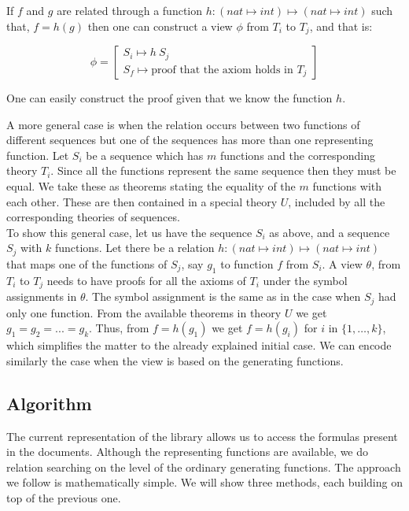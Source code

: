 If $f$ and $g$ are related through a function $h : (nat \mapsto int) \mapsto (nat \mapsto int)$ such that, $f = h(g)$
 then one can construct a view $\phi$ from $T_i$ to $T_j$, and that is:

\begin{equation}
\phi = \begin{bmatrix} S_i \mapsto h\ S_j  \\ S_{f} \mapsto  \text{proof that the axiom holds in } T_j \end{bmatrix}
\end{equation}

One can easily construct the proof given that we know the function $h$.

A more general case is when the relation occurs between two functions of different sequences but one of the sequences
 has more than one representing function.
Let $S_i$ be a sequence which has $m$ functions and the corresponding theory $T_i$. Since all the functions represent
 the same sequence then they must be equal. We take these as theorems stating the equality of the $m$ functions with
 each other. These are then contained in a special theory $U$, included by all the corresponding theories of sequences. \\
To show this general case, let us have the sequence $S_i$ as above, and a sequence $S_j$ with $k$ functions. Let
there be a relation $h: (nat \mapsto int) \mapsto (nat \mapsto int)$ that maps one of the functions of $S_j$, say
$g_1$ to function $f$ from $S_i$. A view $\theta$, from $T_i$ to $T_j$ needs to have proofs for all the axioms of
$T_i$ under the symbol assignments in $\theta$. The symbol assignment is the same as in the case when $S_j$ had only
one function. From the available theorems in theory $U$ we get $g_1=g_2=...=g_k$. Thus, from $f=h(g_1)$ we get $f=h
(g_i)$ for $i$ in $\{1,\ldots, k\}$, which simplifies the matter to the already explained initial case.
We can encode similarly the case when the view is based on the generating functions.

\subsection{Algorithm}

The current representation of the library allows us to access the formulas present in the \oeis documents. Although
the representing functions are available, we do relation searching on the level of the ordinary generating functions.
 The approach we follow is mathematically simple. We will show three methods, each building on top of the previous one.

